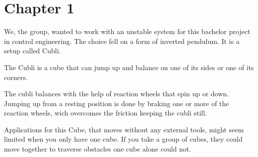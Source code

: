 \chapter{Chapter 1}
We, the group, wanted to work with an unstable system for this bachelor project in control engineering. The choice fell on a form of inverted pendulum. It is a setup called Cubli.

The Cubli is a cube that can jump up and balance on one of its sides or one of its corners.\cite{MGajamohan}

The cubli balances with the help of reaction wheels that spin up or down. Jumping up from a resting position is done by braking one or more of the reaction wheels, wich overcomes the friction keeping the cubli still.

Applications for this Cube, that moves without any external tools, might seem limited when you only have one cube. If you take a group of cubes, they could move together to traverse obstacles one cube alone could not. \cite{JRomanishin}


